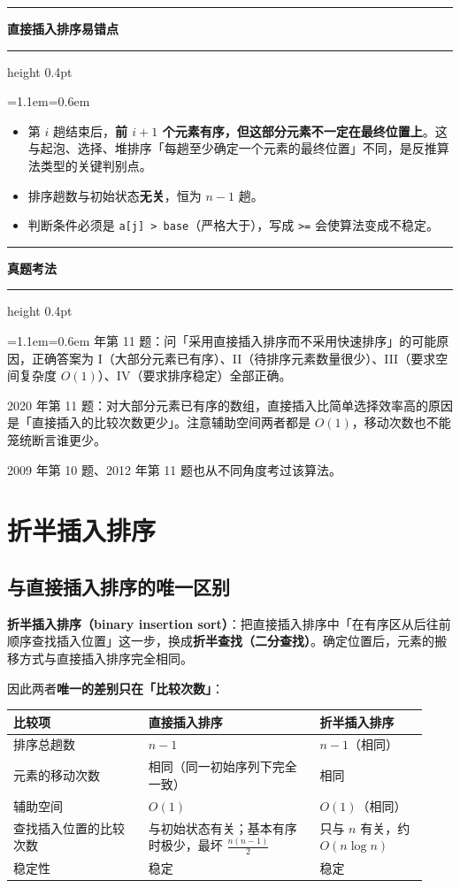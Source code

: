 \documentclass[11pt,openany,UTF8]{ctexbook}
\newcommand{\callouthead}[2]{%
  \par\addvspace{7pt}\noindent
  {\color{#1}\rule[-0.15em]{3pt}{1.05em}}\hspace{0.5em}%
  {\bfseries\color{#1}#2}\par\nobreak\vspace{-0.35em}%
  {\color{rulesep}\hrule height 0.4pt}\nobreak\vspace{0.45em}%
  \begingroup\small\setlength{\parindent}{0pt}%
  \leftskip=1.1em\rightskip=0.6em\noindent\ignorespaces}
\newcommand{\calloutend}{\par\endgroup\addvspace{7pt}}
\newenvironment{callwarn}[1]{\callouthead{warnbar}{#1}}{\calloutend}
\newenvironment{callexam}[1]{\callouthead{exambar}{#1}}{\calloutend}
\begin{document}
\begin{callwarn}{直接插入排序易错点}
\begin{itemize}
\item 第 $i$ 趟结束后，\textbf{前 $i+1$ 个元素有序，但这部分元素不一定在最终位置上}。这与起泡、选择、堆排序「每趟至少确定一个元素的最终位置」不同，是反推算法类型的关键判别点。
\item 排序趟数与初始状态\textbf{无关}，恒为 $n-1$ 趟。
\item 判断条件必须是 \texttt{a[j]\allowbreak{} >\allowbreak{} base}（严格大于），写成 \texttt{>\allowbreak{}=\allowbreak{}} 会使算法变成不稳定。
\end{itemize}
\end{callwarn}

\begin{callexam}{真题考法}
2022 年第 11 题：问「采用直接插入排序而不采用快速排序」的可能原因，正确答案为 I（大部分元素已有序）、II（待排序元素数量很少）、III（要求空间复杂度 $O(1)$）、IV（要求排序稳定）全部正确。

2020 年第 11 题：对大部分元素已有序的数组，直接插入比简单选择效率高的原因是「直接插入的比较次数更少」。注意辅助空间两者都是 $O(1)$，移动次数也不能笼统断言谁更少。

2009 年第 10 题、2012 年第 11 题也从不同角度考过该算法。

\end{callexam}

\section{折半插入排序}

\subsection{与直接插入排序的唯一区别}

\textbf{折半插入排序（binary insertion sort）}：把直接插入排序中「在有序区从后往前顺序查找插入位置」这一步，换成\textbf{折半查找（二分查找）}。确定位置后，元素的搬移方式与直接插入排序完全相同。

因此两者\textbf{唯一的差别只在「比较次数」}：

\begingroup\small\setlength{\tabcolsep}{4.0pt}
\begin{longtable}{@{}L{0.3004\linewidth}L{0.3823\linewidth}L{0.2458\linewidth}@{}}
\toprule
\textbf{比较项} & \textbf{直接插入排序} & \textbf{折半插入排序} \\
\midrule
\endhead
排序总趟数 & $n-1$ & $n-1$（相同） \\
元素的移动次数 & 相同（同一初始序列下完全一致） & 相同 \\
辅助空间 & $O(1)$ & $O(1)$（相同） \\
查找插入位置的比较次数 & 与初始状态有关；基本有序时极少，最坏 $\frac{n(n-1)}{2}$ & 只与 $n$ 有关，约 $O(n\log n)$ \\
稳定性 & 稳定 & 稳定 \\
\bottomrule
\end{longtable}
\endgroup
\end{document}
